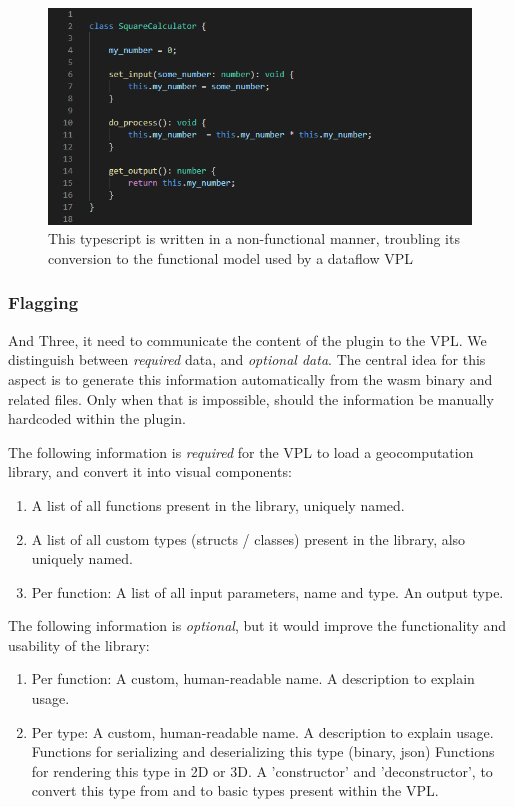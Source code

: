 \begin{figure}
  \centering
  \graphicspath{ {../../assets/images/6/3/} }
  \includegraphics[width=\linewidth]{ugly-oop.png}
  \caption[]{This typescript is written in a non-functional manner, troubling its conversion to the functional model used by a dataflow VPL}
  \label{fig:oop-considered-harmful}
\end{figure}

\subsubsection{Flagging}

And Three, it need to communicate the content of the plugin to the VPL. 
We distinguish between \emph{required} data, and \emph{optional data}.
The central idea for this aspect is to generate this information automatically from the wasm binary and related files.
Only when that is impossible, should the information be manually hardcoded within the plugin.

The following information is \emph{required} for the VPL to load a geocomputation library, and convert it into visual components:

\begin{enumerate}[-]
  \item A list of all functions present in the library, uniquely named.
  \item A list of all custom types (structs / classes) present in the library, also uniquely named.
  \item Per function:  
  \subitem A list of all input parameters, name and type.
  \subitem An output type.
\end{enumerate}

The following information is \emph{optional}, but it would improve the functionality and usability of the library:
\begin{enumerate}[-]
  \item Per function:
  \subitem A custom, human-readable name.
  \subitem A description to explain usage.

  \item Per type:
  \subitem A custom, human-readable name.
  \subitem A description to explain usage.
  \subitem Functions for serializing and deserializing this type (binary, json)  
  \subitem Functions for rendering this type in 2D or 3D.
  \subitem A 'constructor' and 'deconstructor', to convert this type from and to basic types present within the VPL.  
\end{enumerate}

